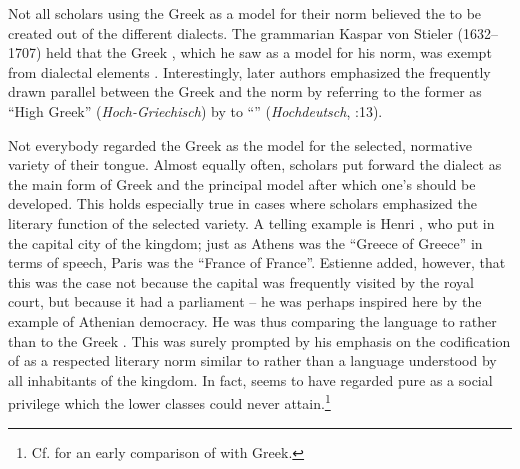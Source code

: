 Not all scholars using the Greek  as a model for their  norm believed the  to be created out of the different dialects. The grammarian Kaspar von Stieler (1632–1707) held that the Greek , which he saw as a model for his  norm, was exempt from dialectal elements \citep[2]{Stieler1691}. Interestingly, later authors emphasized the frequently drawn parallel between the Greek  and the  norm by referring to the former as “High Greek” (\textit{Hoch-Griechisch}) by  to “” (\textit{Hochdeutsch}, \citealt{Schuster1737}:13).

Not everybody regarded the Greek  as the model for the selected, normative variety of their  tongue. Almost equally often, scholars put forward the  dialect as the main form of Greek and the principal model after which one’s  should be developed. This holds especially true in cases where scholars emphasized the literary function of the selected variety. A telling example is Henri \citet[*.iii\textsc{\textsuperscript{v}}]{Estienne1582}, who put  in the capital city of the kingdom; just as Athens was the “Greece of Greece” in terms of speech, Paris was the “France of France”. Estienne added, however, that this was the case not because the  capital was frequently visited by the royal court, but because it had a parliament – he was perhaps inspired here by the example of Athenian democracy. He was thus comparing the  language to  rather than to the Greek . This was surely prompted by his emphasis on the codification of  as a respected literary norm similar to  rather than a language understood by all inhabitants of the kingdom. In fact, \citet[*.iii\textsc{\textsuperscript{r}}]{Estienne1582} seems to have regarded pure  as a social privilege which the lower classes could never attain.\footnote{Cf. \citet[\textsc{xxxiii}\textsc{\textsuperscript{v}}]{Marineo1497} for an early comparison of   with  Greek.}


